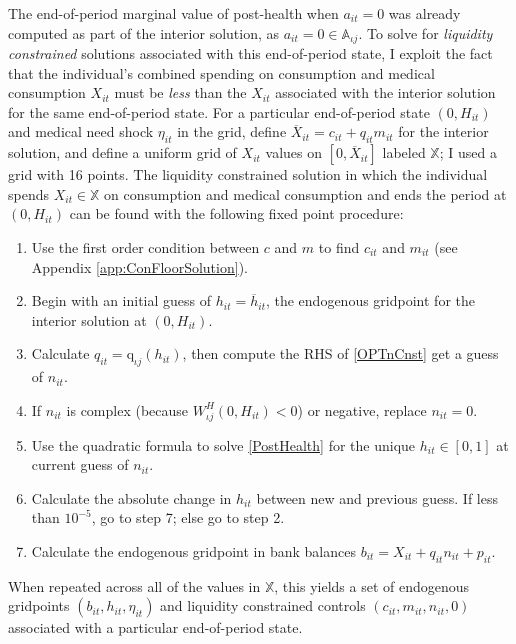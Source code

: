 \documentclass[12pt,pdftex,letterpaper]{article}
\newcommand{\Type}{\iota}
\newcommand{\Health}{h}
\newcommand{\PostHealth}{H}
\newcommand{\PostValue}{W}
\newcommand{\Con}{c}
\newcommand{\Care}{m}
\newcommand{\Invst}{n}
\newcommand{\Xpend}{X}
\newcommand{\Bank}{b}
\newcommand{\Assets}{a}
\newcommand{\Premium}{p}
\newcommand{\Copay}{q}
\newcommand{\CopayFunc}{\text{\Copay}}
\newcommand{\Age}{j}
\newcommand{\MedShk}{\eta}
\begin{document}
The end-of-period marginal value of post-health when $\Assets_{it}=0$ was already computed as part of the interior solution, as $\Assets_{it}=0 \in \mathbb{A}_{\Type \Age}$.  To solve for \textit{liquidity constrained} solutions associated with this end-of-period state, I exploit the fact that the individual's combined spending on consumption and medical consumption $\Xpend_{it}$ must be \textit{less} than the $\Xpend_{it}$ associated with the interior solution for the same end-of-period state.  For a particular end-of-period state $(0,\PostHealth_{it})$ and medical need shock $\MedShk_{it}$ in the grid, define $\overline{\Xpend}_{it} = \Con_{it} + \Copay_{it} \Care_{it}$ for the interior solution, and define a uniform grid of $\Xpend_{it}$ values on $[0,\overline{\Xpend}_{it}]$ labeled $\mathbb{X}$; I used a grid with 16 points.  The liquidity constrained solution in which the individual spends $\Xpend_{it} \in \mathbb{X}$ on consumption and medical consumption and ends the period at $(0,\PostHealth_{it})$ can be found with the following fixed point procedure:
\begin{enumerate}
\item Use the first order condition between $\Con$ and $\Care$ to find $\Con_{it}$ and $\Care_{it}$ (see Appendix \ref{app:ConFloorSolution}).

\item Begin with an initial guess of $\Health_{it} = \overline{\Health}_{it}$, the endogenous gridpoint for the interior solution at $(0,\PostHealth_{it})$.

\item Calculate $\Copay_{it} = \CopayFunc_{\Type \Age}(\Health_{it})$, then compute the RHS of \eqref{OPTnCnst} get a guess of $\Invst_{it}$.

\item If $\Invst_{it}$ is complex (because $\PostValue^\PostHealth_{\Type \Age}(0,\PostHealth_{it}) < 0$) or negative, replace $\Invst_{it} = 0$.

\item Use the quadratic formula to solve \eqref{PostHealth} for the unique $\Health_{it} \in [0,1]$ at current guess of $\Invst_{it}$.

\item Calculate the absolute change in $\Health_{it}$ between new and previous guess.  If less than $10^{-5}$, go to step 7; else go to step 2.

\item Calculate the endogenous gridpoint in bank balances $\Bank_{it} = \Xpend_{it} + \Copay_{it} \Invst_{it} + \Premium_{it}$.
\end{enumerate}
When repeated across all of the values in $\mathbb{X}$, this yields a set of endogenous gridpoints $(\Bank_{it},\Health_{it},\MedShk_{it})$ and liquidity constrained controls $(\Con_{it},\Care_{it},\Invst_{it},0)$ associated with a particular end-of-period state.
\end{document}
